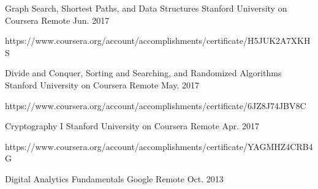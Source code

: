 

\begin{cventries}

  \cventry
    {Graph Search, Shortest Paths, and Data Structures} %
    {Stanford University on Coursera} %
    {Remote} %
    {Jun. 2017} %
    {
      \begin{cvitems} %
       \item {https://www.coursera.org/account/accomplishments/certificate/H5JUK2A7XKHS}
      \end{cvitems}
    }

  \cventry
    {Divide and Conquer, Sorting and Searching, and Randomized Algorithms} %
    {Stanford University on Coursera} %
    {Remote} %
    {May. 2017} %
    {
      \begin{cvitems} %
       \item {https://www.coursera.org/account/accomplishments/certificate/6JZ8J74JBV8C}
      \end{cvitems}
    }
  \cventry
    {Cryptography I} %
    {Stanford University on Coursera} %
    {Remote} %
    {Apr. 2017} %
    {
      \begin{cvitems} %
       \item {https://www.coursera.org/account/accomplishments/certificate/YAGMHZ4CRB4G}
      \end{cvitems}
    }
  \cventry
    {Digital Analytics Fundamentals} %
    {Google} %
    {Remote} %
    {Oct. 2013} %
    {}
\end{cventries}
